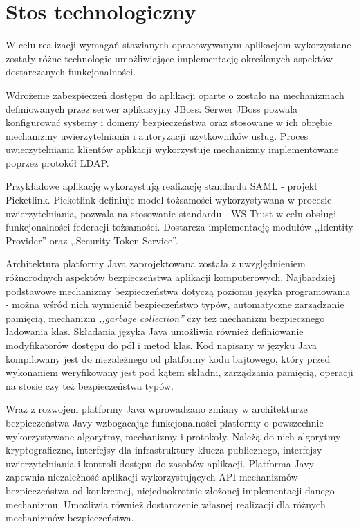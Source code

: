 \chapter{Stos technologiczny}
\label{cha:stosTechnologiczny}

{\it

W celu realizacji wymagań stawianych opracowywanym aplikacjom wykorzystane zostały różne technologie umożliwiające implementację określonych aspektów dostarczanych funkcjonalności.

Wdrożenie zabezpieczeń dostępu do aplikacji oparte o zostało na mechanizmach definiowanych przez serwer aplikacyjny JBoss. Serwer JBoss pozwala konfigurować systemy i domeny bezpieczeństwa oraz stosowane w ich obrębie mechanizmy uwierzytelniania i autoryzacji użytkowników usług. Proces uwierzytelniania klientów aplikacji wykorzystuje mechanizmy implementowane poprzez protokół LDAP. 

Przykładowe aplikację wykorzystują realizację standardu SAML - projekt Picketlink. Picketlink definiuje model tożsamości wykorzystywana w procesie uwierzytelniania, pozwala na stosowanie standardu - WS-Trust w celu obsługi funkcjonalności federacji tożsamości. Dostarcza implementację modułów ,,Identity Provider'' oraz ,,Security Token Service''. 

}

\label{sec:javaSE}

	Architektura platformy Java zaprojektowana została z uwzględnieniem różnorodnych aspektów bezpieczeństwa aplikacji komputerowych. Najbardziej podstawowe mechanizmy bezpieczeństwa dotyczą poziomu języka programowania - można wśród nich wymienić bezpieczeństwo typów, automatyczne zarządzanie pamięcią, mechanizm \textit{,,garbage collection''} czy też mechanizm bezpiecznego ładowania klas. Składania języka Java umożliwia również definiowanie modyfikatorów dostępu do pól i metod klas. Kod napisany w języku Java kompilowany jest do niezależnego od platformy kodu bajtowego, który przed wykonaniem weryfikowany jest pod kątem składni, zarządzania pamięcią, operacji na stosie czy też bezpieczeństwa typów\cite{Oracle13}.

	Wraz z rozwojem platformy Java wprowadzano zmiany w architekturze bezpieczeństwa Javy wzbogacając funkcjonalności platformy o powszechnie wykorzystywane algorytmy, mechanizmy i protokoły. Należą do nich algorytmy kryptograficzne, interfejsy dla infrastruktury klucza publicznego, interfejsy uwierzytelniania i kontroli dostępu do zasobów aplikacji. Platforma Javy zapewnia niezależność aplikacji wykorzystujących API mechanizmów bezpieczeństwa od konkretnej, niejednokrotnie złożonej implementacji danego mechanizmu. Umożliwia również dostarczenie własnej realizacji dla różnych mechanizmów bezpieczeństwa.

